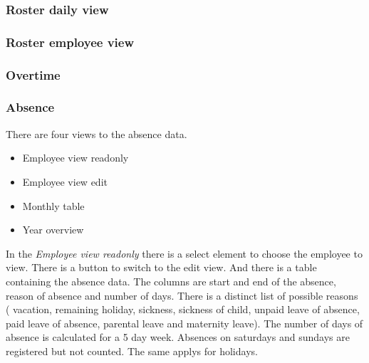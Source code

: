 \subsubsection{Roster daily view}
\subsubsection{Roster employee view}
\subsubsection{Overtime}
\subsubsection{Absence}
There are four views to the absence data.
\begin{itemize}
\item Employee view readonly
\item Employee view edit
\item Monthly table
\item Year overview
\end{itemize}
In the \emph{Employee view readonly} there is a select element to choose the employee to view. There is a button to switch to the edit view.
And there is a table containing the absence data. The columns are start and end of the absence, reason of absence and number of days.
There is a distinct list of possible reasons ( vacation,
        remaining holiday,
       sickness,
        sickness of child,
        unpaid leave of absence,
        paid leave of absence,
        parental leave and
        maternity leave).
The number of days of absence is calculated for a 5 day week. Absences on saturdays and sundays are registered but not counted. The same applys for holidays.